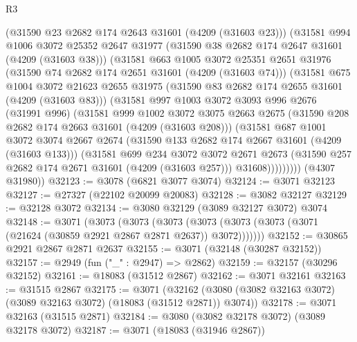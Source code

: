 \begin{lexlean}{R3}
\begin{coremodule}
          (@31590 @23 @2682 @174 @2643 @31601 (@4209 (@31603 @23)))
          (@31581
            @994
            @1006
            @3072
            @25352
            @2647
            @31977
            (@31590 @38 @2682 @174 @2647 @31601 (@4209 (@31603 @38)))
            (@31581
              @663
              @1005
              @3072
              @25351
              @2651
              @31976
              (@31590 @74 @2682 @174 @2651 @31601 (@4209 (@31603 @74)))
              (@31581
                @675
                @1004
                @3072
                @21623
                @2655
                @31975
                (@31590 @83 @2682 @174 @2655 @31601 (@4209 (@31603 @83)))
                (@31581
                  @997
                  @1003
                  @3072
                  @3093
                  @996
                  @2676
                  (@31991 @996)
                  (@31581
                    @999
                    @1002
                    @3072
                    @3075
                    @2663
                    @2675
                    (@31590 @208 @2682 @174 @2663 @31601 (@4209 (@31603 @208)))
                    (@31581
                      @687
                      @1001
                      @3072
                      @3074
                      @2667
                      @2674
                      (@31590 @133 @2682 @174 @2667 @31601 (@4209 (@31603 @133)))
                      (@31581
                        @699
                        @234
                        @3072
                        @3072
                        @2671
                        @2673
                        (@31590 @257 @2682 @174 @2671 @31601 (@4209 (@31603 @257)))
                        @31608)))))))))
      (@4307 @31980))
@32123 := @3078 (@6821 @3077 @3074)
@32124 := @3071 @32123
@32127 := @27327 (@22102 @20099 @20083)
@32128 := @3082 @32127
@32129 := @32128 @3072
@32134 := @3080 @32129 (@3089 @32127 @3072) @3074
@32148 := @3071
    (@3073
      (@3073
        (@3073 (@3073 (@3073 (@3073 (@3071 (@21624 (@30859 @2921 @2867 @2871 @2637)) @3072)))))))
@32152 := @30865 @2921 @2867 @2871 @2637
@32155 := @3071 (@32148 (@30287 @32152))
@32157 := @2949 (fun ("_" : @2947) => @2862)
@32159 := @32157 (@30296 @32152)
@32161 := @18083 (@31512 @2867)
@32162 := @3071 @32161
@32163 := @31515 @2867
@32175 := @3071
    (@32162 (@3080 (@3082 @32163 @3072) (@3089 @32163 @3072) (@18083 (@31512 @2871)) @3074))
@32178 := @3071 @32163 (@31515 @2871)
@32184 := @3080 (@3082 @32178 @3072) (@3089 @32178 @3072)
@32187 := @3071 (@18083 (@31946 @2867))

\end{coremodule}
\end{lexlean}
